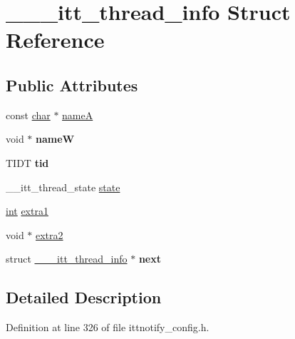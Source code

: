 \hypertarget{struct______itt__thread__info}{}\section{\+\_\+\+\_\+\+\_\+itt\+\_\+thread\+\_\+info Struct Reference}
\label{struct______itt__thread__info}
\subsection*{Public Attributes}
\begin{DoxyCompactItemize}
\item 
const \mbox{\hyperlink{classchar}{char}} $\ast$ \mbox{\hyperlink{struct______itt__thread__info_af0d071b9ab2b86c040a6de800f92cb30}{nameA}}
\item 
\mbox{\label{struct______itt__thread__info_a607067bccd38bfb17c9f7c8676caf03d}} 
void $\ast$ {\bfseries nameW}
\item 
\mbox{\label{struct______itt__thread__info_adfe992c44e507418c56b509c9c985393}} 
T\+I\+DT {\bfseries tid}
\item 
\+\_\+\+\_\+itt\+\_\+thread\+\_\+state \mbox{\hyperlink{struct______itt__thread__info_a6f6f3ed5a462461cc8dc05b650e331ba}{state}}
\item 
\mbox{\hyperlink{classint}{int}} \mbox{\hyperlink{struct______itt__thread__info_a24093b12fcbe313abcf61c449d42d66c}{extra1}}
\item 
void $\ast$ \mbox{\hyperlink{struct______itt__thread__info_a29a043e53a66cc89b62b11f0ad8e7588}{extra2}}
\item 
\mbox{\label{struct______itt__thread__info_a1c1665afb537536190a66931a94ccae8}} 
struct \mbox{\hyperlink{struct______itt__thread__info}{\+\_\+\+\_\+\+\_\+itt\+\_\+thread\+\_\+info}} $\ast$ {\bfseries next}
\end{DoxyCompactItemize}


\subsection{Detailed Description}


Definition at line 326 of file ittnotify\+\_\+config.\+h.



